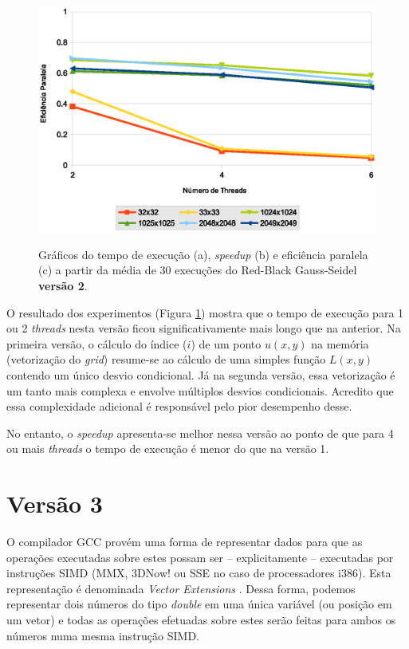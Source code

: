 \begin{figure}[H]
    \begin{minipage}{.5\textwidth}
        \includegraphics[width=\textwidth]{figures/efficiency-v2}
        \label{subfig:efficiency-v2}
    \end{minipage}%

    \caption{Gráficos do tempo de execução (a), \textit{speedup} (b) e eficiência paralela (c) a partir da média de 30 execuções do Red-Black Gauss-Seidel \textbf{versão 2}.}
    \label{fig:perf-v2}
\end{figure}

O resultado dos experimentos (Figura \ref{fig:perf-v2}) mostra que o tempo de execução para 1 ou 2 \textit{threads} nesta versão ficou significativamente mais longo que na anterior. Na primeira versão, o cálculo do índice ($i$) de um ponto $u(x, y)$ na memória (vetorização do \textit{grid}) resume-se ao cálculo de uma simples função $L(x, y)$ contendo um único desvio condicional. Já na segunda versão, essa vetorização é um tanto mais complexa e envolve múltiplos desvios condicionais. Acredito que essa complexidade adicional é responsável pelo pior desempenho desse.

No entanto, o \textit{speedup} apresenta-se melhor nessa versão ao ponto de que para 4 ou mais \textit{threads} o tempo de execução é menor do que na versão 1.


\section{Versão 3}
\label{sec:gs-version3}

O compilador GCC provém uma forma de representar dados para que as operações executadas sobre estes possam ser -- explicitamente -- executadas por instruções SIMD (MMX, 3DNow! ou SSE no caso de processadores i386). Esta representação é denominada \textit{Vector Extensions} \cite{vectorextensions}. Dessa forma, podemos representar dois números do tipo \textit{double} em uma única variável (ou posição em um vetor) e todas as operações efetuadas sobre estes serão feitas para ambos os números numa mesma instrução SIMD.

